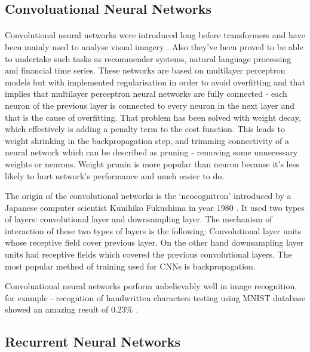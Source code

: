 \documentclass[12pt]{report}
\begin{document}
    \subsection*{Convoluational Neural Networks}
    \paragraph{}

    Convolutional neural networks were introduced long before transformers and have been mainly used to analyse visual imagery \citep{VALUEVA2020232}. Also they've been proved to be able to undertake such tasks as recommender systems, natural language processing and financial time series.
    These networks are based on multilayer perceptron models but with implemented regularisation in order to avoid overfitting and that implies that multilayer perceptron neural networks are fully connected - each neuron of the previous layer is connected to every neuron in the next layer and that is the cause of overfitting.
    That problem has been solved with weight decay, which effectively is adding a penalty term to the cost function. This leads to weight shrinking in the backpropagation step, and trimming connectivity of a neural network which can be described as pruning - removing some unnecessary weights or neurons. Weight prunin is more popular than neuron because it's less likely
    to hurt network's performance and much easier to do. 

    The origin of the convolutional networks is the `neocognitron' introduced by a Japanese computer scientist Kunihiko Fukushima in year 1980 \citep{neocognitron}. It used two types of layers: convolutional layer and downsampling layer. The mechanism of interaction of these two types of layers is the following:
    Convolutional layer units whose receptive field cover previous layer. On the other hand downsampling layer units had receptive fields which covered the previous convolutional layers. The most popular method of training used for CNNs is backpropagation.

    Convoluational neural networks perform unbelievably well in image recognition, for example - recogntion of handwritten characters testing using MNIST database showed an amazing result of 0.23\% \citep{image_classification_article}.

    \subsection*{Recurrent Neural Networks}
\end{document}
